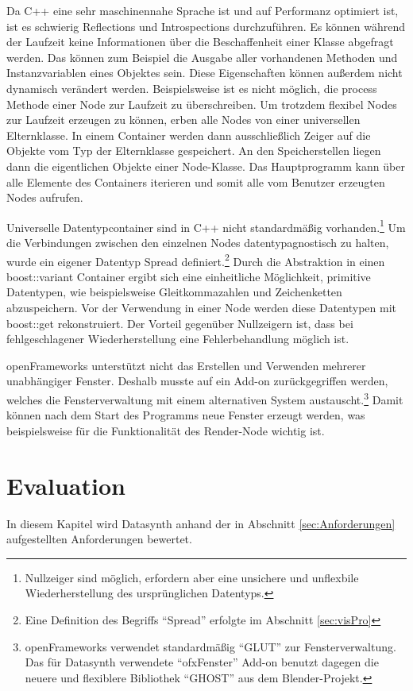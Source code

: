 \documentclass[a4paper, 
               12pt,
               DIV=calc,
               version=first,
               pdftex,
               headsepline,
               footsepline,
               bibliography=totocnumbered,
               listof=numbered]{scrreprt}
\begin{document}
Da C++ eine sehr maschinennahe Sprache ist und auf Performanz optimiert ist,
ist es schwierig Reflections und Introspections durchzuführen.
Es können während der Laufzeit keine Informationen
über die Beschaffenheit einer Klasse abgefragt werden.
Das können zum Beispiel die Ausgabe aller vorhandenen Methoden und Instanzvariablen eines Objektes sein.
Diese Eigenschaften können außerdem nicht dynamisch verändert werden. Beispielsweise
ist es nicht möglich, die process Methode einer Node zur Laufzeit zu überschreiben.
Um trotzdem flexibel Nodes zur Laufzeit erzeugen zu können, erben alle Nodes
von einer universellen Elternklasse. In einem Container werden dann ausschließlich Zeiger
auf die Objekte vom Typ der Elternklasse gespeichert. An den Speicherstellen
liegen dann die eigentlichen Objekte einer Node-Klasse. Das Hauptprogramm kann
über alle Elemente des Containers iterieren und somit alle vom Benutzer erzeugten
Nodes aufrufen.

Universelle Datentypcontainer sind in C++ nicht standardmäßig vorhanden.\footnote{Nullzeiger sind
möglich, erfordern aber eine unsichere und unflexbile Wiederherstellung des ursprünglichen Datentyps.} Um die Verbindungen
zwischen den einzelnen Nodes datentypagnostisch zu halten, wurde ein
eigener Datentyp Spread definiert.\footnote{Eine Definition des Begriffs "`Spread"' erfolgte im Abschnitt \ref{sec:visPro}}
Durch die Abstraktion in einen boost::variant Container ergibt sich eine einheitliche Möglichkeit, primitive Datentypen,
wie beispielsweise Gleitkommazahlen und Zeichenketten abzuspeichern. Vor der Verwendung in einer Node werden diese
Datentypen mit boost::get rekonstruiert. Der Vorteil gegenüber Nullzeigern ist, dass bei fehlgeschlagener
Wiederherstellung eine Fehlerbehandlung möglich ist.

openFrameworks unterstützt nicht das Erstellen und Verwenden mehrerer
unabhängiger Fenster. Deshalb musste
auf ein Add-on zurückgegriffen werden, welches die Fensterverwaltung
mit einem alternativen System austauscht.\footnote{openFrameworks verwendet standardmäßig "`GLUT"'
zur Fensterverwaltung. Das für Datasynth verwendete "`ofxFenster"' Add-on benutzt dagegen die neuere und
flexiblere Bibliothek "`GHOST"' aus dem Blender-Projekt.} Damit können nach dem Start des Programms
neue Fenster erzeugt werden, was beispielsweise für die Funktionalität des Render-Node wichtig ist.

\chapter{Evaluation}
\label{cha:Auswertung}
In diesem Kapitel wird Datasynth anhand der in Abschnitt \ref{sec:Anforderungen}
aufgestellten Anforderungen bewertet.
\end{document}
